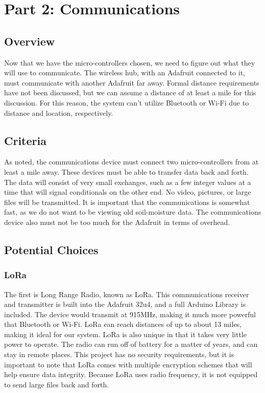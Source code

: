 \documentclass[onecolumn, draftclsnofoot,10pt, compsoc]{IEEEtran}
\begin{document}
    \section{Part 2: Communications}
	
	\subsection{Overview}
    Now that we have the micro-controllers chosen, we need to figure out what they will use to communicate. 
    The wireless hub, with an Adafruit connected to it, must communicate with another Adafruit far away.
    Formal distance requirements have not been discussed, but we can assume a distance of at least a mile for this discussion. 
    For this reason, the system can't utilize Bluetooth or Wi-Fi due to distance and location, respectively.  
    \subsection{Criteria}
    As noted, the communications device must connect two micro-controllers from at least a mile away. 
    These devices must be able to transfer data back and forth.
    The data will consist of very small exchanges, such as a few integer values at a time that will signal conditionals on the other end.
    No video, pictures, or large files will be transmitted. 
    It is important that the communications is somewhat fast, as we do not want to be viewing old soil-moisture data. 
    The communications device also must not be too much for the Adafruit in terms of overhead. 
    
    \subsection{Potential Choices}
    
    \subsubsection{LoRa}
    The first is Long Range Radio, known as LoRa. 
    This communications receiver and transmitter is built into the Adafruit 32u4, and a full Arduino Library is included. 
    The device would transmit at 915MHz, making it much more powerful that Bluetooth or Wi-Fi.
    LoRa can reach distances of up to about 13 miles, making it ideal for our system.
    LoRa is also unique in that it takes very little power to operate. 
    The radio can run off of battery for a matter of years, and can stay in remote places.
    This project has no security requirements, but it is important to note that LoRa comes with multiple encryption schemes that will help ensure data integrity. 
    Because LoRa uses radio frequency, it is not equipped to send large files back and forth.
\end{document}
